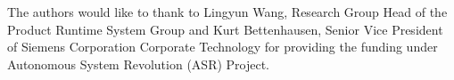 \documentclass[3p,twocolumn,times,procedia]{elsarticle}
\begin{document}
The authors would like to thank to Lingyun Wang, Research Group Head of the Product Runtime System Group and Kurt Bettenhausen, Senior Vice President of Siemens Corporation Corporate Technology for providing the funding under Autonomous System Revolution (ASR) Project.



%
%


\end{document}
